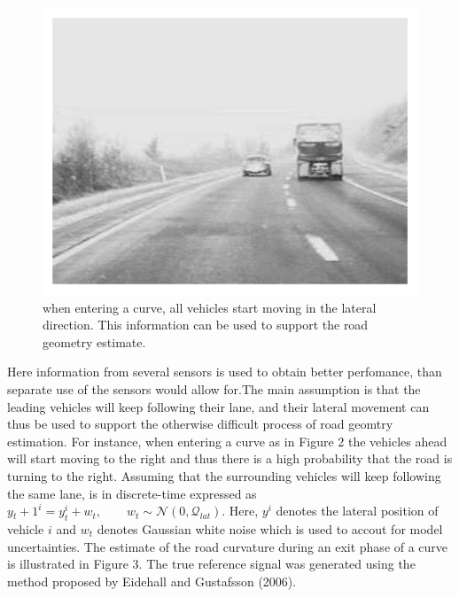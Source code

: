 \documentclass[11pt,oneside,a4paper]{article}
\begin{document}
\begin{figure}[H]
  \begin{center}
  \includegraphics[height=0.3\textheight]{./source/PF/2.png}
  \caption{when entering a curve, all vehicles start moving in the lateral direction. This information
  can be used to support the road geometry estimate.}
  \label{}
  \end{center}
\end{figure}
Here information from several sensors is used to obtain better perfomance, than separate use of the sensors would allow for.The main
assumption is that the leading vehicles will keep following their lane, and their lateral movement can thus be used to support the otherwise
difficult process of road geomtry estimation. For instance, when entering a curve as in Figure 2 the vehicles ahead will start moving to
the right and thus there is a high probability that the road is turning to the right.
Assuming that the surrounding vehicles will keep following the same lane, is in discrete-time expressed as
$y{_t+1}^i = y_{t}^i + w_t,\qquad w_t \sim \mathcal{N}(0, \mathcal{Q}_{lat}). $ Here, $y^i $ denotes the lateral
position of vehicle $i $ and $w_t $ denotes Gaussian white noise which is used to accout for model uncertainties.
The estimate of the road curvature during an exit phase of a curve is illustrated in Figure 3. The true reference
signal was generated using the method proposed by Eidehall and Gustafsson (2006).
\end{document}
